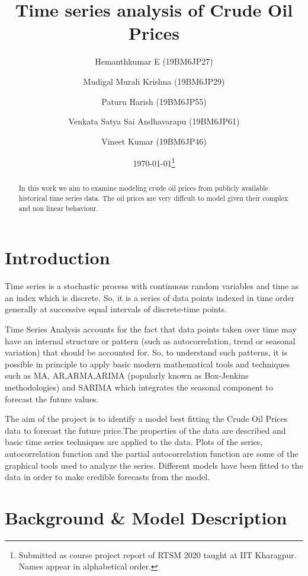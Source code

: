 \documentclass[11pt,a4paper]{article}
\begin{document}
	\title{\textbf{Time series analysis of Crude Oil Prices}}
	\author{Hemanthkumar E (19BM6JP27)\and
		Mudigal Murali Krishna (19BM6JP29) \and 
		Paturu Harish (19BM6JP55) \and 
		Venkata Satya Sai Andhavarapu (19BM6JP61) \and 
		Vineet Kumar (19BM6JP46)
	}
\date{\today\thanks{Submitted as course project report of RTSM 2020 taught at IIT Kharagpur. Names appear in alphabetical order.}}
\maketitle
\begin{abstract}
	In this work we aim to examine modeling crude oil prices from publicly available historical time series data. The oil prices are very diffcult to model given their complex and non linear behaviour. 
\end{abstract}
\maketitle
\section{Introduction}
 
Time series is a stochastic process with continuous random variables and time as an index which is discrete. So, it is a series of data points indexed in time order generally at successive equal intervals of discrete-time points.

Time Series Analysis accounts for the fact that data points taken over time may have an internal structure or pattern (such as autocorrelation, trend or seasonal variation) that should be accounted for. So, to understand such patterns, it is possible in principle to apply basic modern mathematical tools and techniques such as MA, AR,ARMA,ARIMA (popularly known as Box-Jenkins methodologies) and SARIMA which integrates the seasonal component to forecast the future values.


The aim of the project is to identify a model best fitting the Crude Oil Prices data to forecast the future price.The properties of the data are described and basic time series techniques are applied to the data. Plots of the series, autocorrelation function and the partial autocorrelation function are some of the graphical tools used to analyze the series. Different models have been fitted to the data in order to make credible forecasts from the model.

\section{Background \& Model Description}
\end{document}
